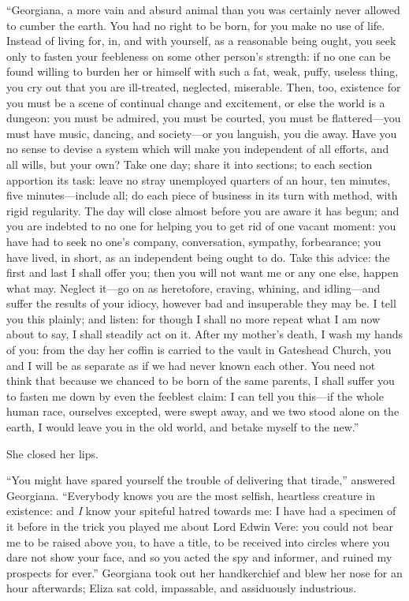 \enquote{Georgiana, a more vain and absurd animal than you was certainly
never allowed to cumber the earth. You had no right to be born, for you
make no use of life. Instead of living for, in, and with yourself, as a
reasonable being ought, you seek only to fasten your feebleness on some
other person's strength: if no one can be found willing to burden her or
himself with such a fat, weak, puffy, useless thing, you cry out that
you are ill-treated, neglected, miserable. Then, too, existence for you
must be a scene of continual change and excitement, or else the world is
a dungeon: you must be admired, you must be courted, you must be
flattered---you must have music, dancing, and society---or you languish,
you die away. Have you no sense to devise a system which will make you
independent of all efforts, and all wills, but your own? Take one day;
share it into sections; to each section apportion its task: leave no
stray unemployed quarters of an hour, ten minutes, five
minutes---include all; do each piece of business in its turn with
method, with rigid regularity. The day will close almost before you are
aware it has begun; and you are indebted to no one for helping you to
get rid of one vacant moment: you have had to seek no one's company,
conversation, sympathy, forbearance; you have lived, in short, as an
independent being ought to do. Take this advice: the first and last I
shall offer you; then you will not want me or any one else, happen what
may. Neglect it---go on as heretofore, craving, whining, and
idling---and suffer the results of your idiocy, however bad and
insuperable they may be. I tell you this plainly; and listen: for
though I shall no more repeat what I am now about to say, I shall
steadily act on it. After my mother's death, I wash my hands of you:
from the day her coffin is carried to the vault in Gateshead Church, you
and I will be as separate as if we had never known each other. You need
not think that because we chanced to be born of the same parents, I
shall suffer you to fasten me down by even the feeblest claim: I can
tell you this---if the whole human race, ourselves excepted, were swept
away, and we two stood alone on the earth, I would leave you in the old
world, and betake myself to the new.}

She closed her lips.

\enquote{You might have spared yourself the trouble of delivering that
tirade,} answered Georgiana. \enquote{Everybody knows you are the most
selfish, heartless creature in existence: and \emph{I} know your
spiteful hatred towards me: I have had a specimen of it before in the
trick you played me about Lord Edwin Vere: you could not bear me to be
raised above you, to have a title, to be received into circles where you
dare not show your face, and so you acted the spy and informer, and
ruined my prospects for ever.} Georgiana took out her handkerchief and
blew her nose for an hour afterwards; Eliza sat cold, impassable, and
assiduously industrious.

